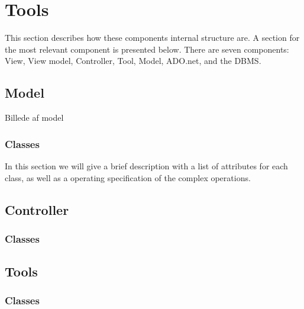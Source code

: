 \section{Tools}

This section describes how these components internal structure are.
A section for the most relevant component is presented below.
There are seven components: View, View model, Controller, Tool, Model, ADO.net, and the DBMS. 



\subsection{Model}

Billede af model


\subsubsection{Classes}
In this section we will give a brief description with a list of attributes for each class, as well as a operating specification of the complex operations.



\subsection{Controller}

\subsubsection{Classes}




\subsection{Tools}

\subsubsection{Classes}